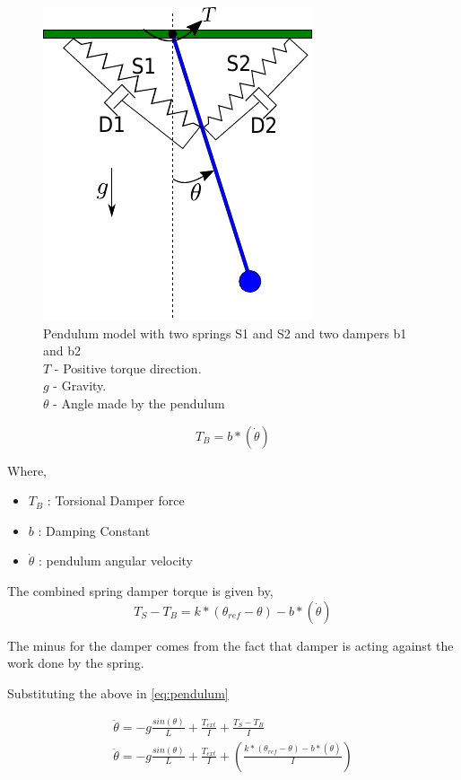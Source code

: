 \documentclass{cmc}
\begin{document}
\begin{figure}[H]
  \centering
  \includegraphics[width=.3\textwidth]{figures/pendulum_spring_damper}
  \caption[pendulum with spring]{Pendulum model with two springs S1
    and S2 and two dampers b1 and b2\\
    $T$ - Positive torque direction.\\
    $g$ - Gravity.\\
    $\theta$ - Angle made by the pendulum}
  \label{fig:pendulum_spring_damper}
\end{figure}



\begin{equation}
  \label{eqn:damper}
  T_{B} = b*(\dot{\theta})
\end{equation}

Where,
\begin{itemize}
\item $T_{B}$ : Torsional Damper force
\item $b$ : Damping Constant
\item $\dot{\theta}$ : pendulum angular velocity
\end{itemize}

The combined spring damper torque is given by,
\begin{equation}
  \label{eq:spring_damper}
  T_{S} - T_{B} = k*(\theta_{ref} - \theta) - b*(\dot{\theta})
\end{equation}

The minus for the damper comes from the fact that damper is acting
against the work done by the spring.

Substituting the above in \ref{eq:pendulum}

\begin{eqnarray}
  \label{eq:spring-damper}
  \ddot{\theta} = -g\frac{sin(\theta)}{L} + \frac{T_{ext}}{I} + \frac{T_{S} - T_{B}}{I} \\
  \ddot{\theta} = -g\frac{sin(\theta)}{L}+ \frac{T_{ext}}{I} + (\frac{k*(\theta_{ref} - \theta) - b*(\dot{\theta})}{I}) \label{eq:genSpringDamper}
\end{eqnarray}
\end{document}
